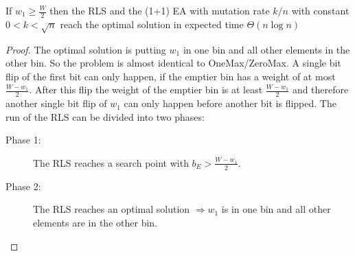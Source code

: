 \begin{theorem}\label{theo:OneMaxResult}
    If $w_1 \ge \frac W 2$  then the RLS and the (1+1) EA with mutation rate $k/n$ with constant $0<k<\sqrt{n}$ reach the optimal solution in expected time $\Theta(n\log{}n)$
\end{theorem}
\begin{proof}
    The optimal solution is putting $w_1$ in one bin and all other elements in the other bin.
    So the problem is almost identical to OneMax/ZeroMax.
    A single bit flip of the first bit can only happen, if the emptier bin has a weight of at most $\frac {W-w_1}{2}$.
    After this flip the weight of the emptier bin is at least $\frac {W-w_1}{2}$ and therefore another single bit flip of $w_1$ can only happen before another bit is flipped.
    The run of the RLS can be divided into two phases:
    \begin{description}
        \item[Phase 1:] The RLS reaches a search point with $b_E > \frac {W-w_1}{2}$.
        \item[Phase 2:] The RLS reaches an optimal solution $\Rightarrow w_1$ is in one bin and all other elements are in the other bin.
    \end{description}


\end{proof}
